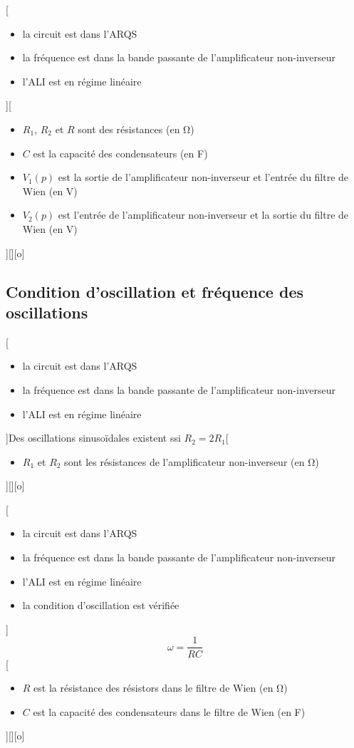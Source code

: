 [%
  \begin{itemize}
    \item la circuit est dans l'ARQS
    \item la fréquence est dans la bande passante de l'amplificateur non-inverseur
    \item l'ALI est en régime linéaire
  \end{itemize}]{\schema{}{4cm}}[%
  \begin{itemize}
    \item $R_1$, $R_2$ et $R$ sont des résistances (en \unit{\ohm})
    \item $C$ est la capacité des condensateurs (en \unit{F})
    \item $V_1(p)$ est la sortie de l'amplificateur non-inverseur et l'entrée du filtre de Wien (en \unit{V})
    \item $V_2(p)$ est l'entrée de l'amplificateur non-inverseur et la sortie du filtre de Wien (en \unit{V})
  \end{itemize}
  ][][o]


\subsection{Condition d'oscillation et fréquence des oscillations}

[%
  \begin{itemize}
    \item la circuit est dans l'ARQS
    \item la fréquence est dans la bande passante de l'amplificateur non-inverseur
    \item l'ALI est en régime linéaire
  \end{itemize}]{Des oscillations sinusoïdales existent ssi $R_2=2R_1$}[%
  \begin{itemize}
    \item $R_1$ et $R_2$ sont les résistances de l'amplificateur non-inverseur (en \unit{\ohm})
  \end{itemize}][][o]

[%
  \begin{itemize}
    \item la circuit est dans l'ARQS
    \item la fréquence est dans la bande passante de l'amplificateur non-inverseur
    \item l'ALI est en régime linéaire
    \item la condition d'oscillation est vérifiée
  \end{itemize}]{$$\omega=\frac{1}{RC}$$}[%
  \begin{itemize}
    \item $R$ est la résistance des résistors dans le filtre de Wien (en \unit{\ohm})
    \item $C$ est la capacité des condensateurs dans le filtre de Wien (en \unit{F})
  \end{itemize}][][o]

